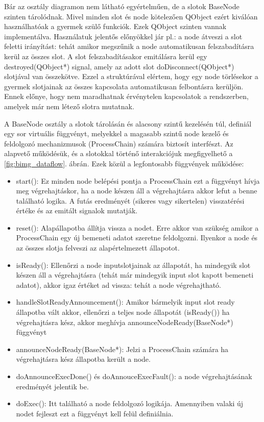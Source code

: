 \documentclass[a4paper,12pt,oneside]{report}
\begin{document}
Bár az osztály diagramon nem látható egyértelműen, de a slotok BaseNode szinten tárolódnak. Mivel minden slot és node kötelezően QObject ezért kiválóan használhatóak a gyermek szülő funkciók. Ezek QObject szinten vannak implementálva. Használatuk jelentős előnyökkel jár pl.: a node átveszi a slot feletti irányítást: tehát amikor megszűnik a node automatikusan felszabadításra kerül az összes slot. A slot felszabadításakor emitálásra kerül egy destroyed(QObject*) signal, amely az adott slot doDisconnect(QObject*) slotjával van összekötve. Ezzel a struktúrával elértem, hogy egy node törlésekor a gyermek slotjainak az összes kapcsolata automatikusan felbontásra kerüljön. Ennek előnye, hogy nem maradhatnak érvénytelen kapcsolatok a rendszerben, amelyek már nem létező slotra mutatnak.

 A BaseNode osztály a slotok tárolásán és alacsony szintű kezelésén túl, definiál egy sor virtuális függvényt, melyekkel a magasabb szintű node kezelő és feldolgozó mechanizmusok (ProcessChain) számára biztosít interfészt. Az alapvető működésük, és a slotokkal történő interakciójuk megfigyelhető a \ref{fig:bimg_dataflow}. ábrán. Ezek közül a legfontosabb függvények működése:
\begin{itemize}
	\itemsep0em
	\item start(): Ez minden node belépési pontja a ProcessChain ezt a függvényt hívja meg végrehajtáskor, ha a node készen áll a végrehajtásra akkor lefut a benne található logika. A futás eredményét (sikeres vagy sikertelen) visszatérési értéke és az emitált signalok mutatják.
	\item reset(): Alapállapotba állítja vissza a nodet. Erre akkor van szükség amikor a ProcessChain egy új bemeneti adatot szeretne feldolgozni. Ilyenkor a node és az összes slotja felveszi az alapértelmezett állapotot.
	\item isReady(): Ellenőrzi a node inputslotjainak az állapotát, ha mindegyik slot készen áll a végrehajtásra (tehát már mindegyik input slot kapott bemeneti adatot), akkor igaz értéket ad vissza: tehát a node végrehajtható.
	\item handleSlotReadyAnnouncement(): Amikor bármelyik input slot ready állapotba vált akkor, ellenőrzi a teljes node állapotát (isReady()) ha végrehajtásra kész, akkor meghívja announceNodeReady(BaseNode*) függvényt
	\item announceNodeReady(BaseNode*): Jelzi a ProcessChain számára ha végrehajtásra kész állapotba került a node.
	\item doAnnounceExecDone() és doAnnouceExecFault(): a node végrehajtásának eredményét jelentik be.
	
	\item doExec(): Itt található a node feldolgozó logikája. Amennyiben valaki új nodet fejleszt ezt a függvényt kell felül definiálnia. 
\end{itemize}
\end{document}
